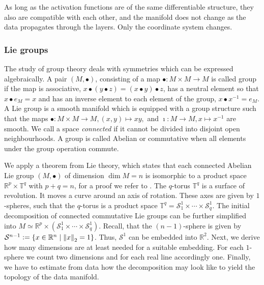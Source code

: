 \documentclass[runningheads,orivec]{llncs}
\begin{document}
As long as the activation functions are of the same differentiable structure, they also are compatible with each other, and the manifold does not change as the data propagates through the layers. Only the coordinate system changes.

\subsubsection{Lie groups} The study of group theory deals with symmetries which can be expressed algebraically. A pair $(M,\bullet)$, consisting of a map $\bullet: M\times M \rightarrow M$ is called group if the map is associative, $x \bullet (y \bullet z) = (x \bullet y) \bullet z$, has a neutral element so that $x \bullet e_{M} = x$ and has an inverse element to each element of the group, $x \bullet x^{-1} = e_{M}$. A Lie group is a smooth manifold which is equipped with a group structure such that the maps $\bullet:M \times  M \rightarrow  M, (x,y) \mapsto xy, $ and $\imath: M \rightarrow  M, x \mapsto x^{-1}$ are smooth. We call a space \emph{connected} if it cannot be divided into disjoint open neighbourhoods. A group is called Abelian or commutative when all elements under the group operation commute.

We apply a theorem from Lie theory, which states that each connected Abelian Lie group $(M,\bullet)$ of dimension $\dim M = n$ is isomorphic to a product space $\mathbb{R}^p \times \mathbb{T}^q$ with $p+q =n$, for a proof we refer to \cite[p.~116]{onishchik1993lie}. The $q$-torus $\mathbb{T}^q$ is a surface of revolution. It moves a curve around an axis of rotation. These axes are given by $1$-spheres, such that the $q$-torus is a product space $\mathbb{T}^q = \mathcal{S}^1_1 \times \cdots \times \mathcal{S}^1_q$. The initial decomposition of connected commutative Lie groups can be further simplified into $M \simeq \mathbb{R}^p \times (\mathcal{S}^1_1 \times \cdots \times \mathcal{S}^1_q)$. Recall, that the $(n-1)$-sphere is given by $\mathcal{S}^{n-1} := \{x \in \mathbb{R}^n \; \vert \; \norm{x}_2 = 1\}$. Thus, $\mathcal{S}^1$ can be embedded into $\mathbb{R}^2$. Next, we derive how many dimensions are at least needed for a suitable embedding. For each $1$-sphere we count two dimensions and for each real line accordingly one. Finally, we have to estimate from data how the decomposition may look like to yield the topology of the data manifold.
\end{document}

